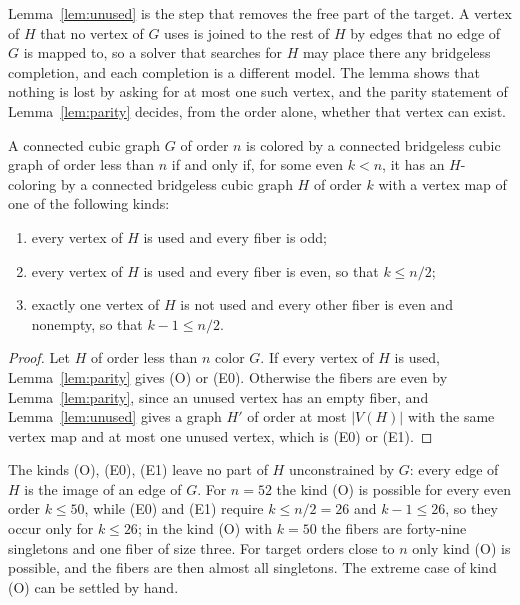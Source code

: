 Lemma~\ref{lem:unused} is the step that removes the free part of the target. A vertex of $H$ that no vertex of $G$
uses is joined to the rest of $H$ by edges that no edge of $G$ is mapped to, so a solver that searches for $H$ may place
there any bridgeless completion, and each completion is a different model. The lemma shows that nothing is lost by
asking for at most one such vertex, and the parity statement of Lemma~\ref{lem:parity} decides, from the order alone, whether
that vertex can exist.

\begin{corollary}[\evD]\label{cor:modes}
A connected cubic graph $G$ of order $n$ is colored by a connected bridgeless cubic graph of order
less than $n$ if and only if, for some even $k < n$, it has an $H$-coloring by a connected
bridgeless cubic graph $H$ of order $k$ with a vertex map of one of the following kinds:
\begin{enumerate}
\item[\textup{(O)}] every vertex of $H$ is used and every fiber is odd;
\item[\textup{(E0)}] every vertex of $H$ is used and every fiber is even, so that $k \le n/2$;
\item[\textup{(E1)}] exactly one vertex of $H$ is not used and every other fiber is even and
nonempty, so that $k - 1 \le n/2$.
\end{enumerate}
\end{corollary}

\begin{proof}
Let $H$ of order less than $n$ color $G$. If every vertex of $H$ is used, Lemma~\ref{lem:parity}
gives (O) or (E0). Otherwise the fibers are even by Lemma~\ref{lem:parity}, since an unused vertex
has an empty fiber, and Lemma~\ref{lem:unused} gives a graph $H'$ of order at most $|V(H)|$ with
the same vertex map and at most one unused vertex, which is (E0) or (E1).
\end{proof}

The kinds (O), (E0), (E1) leave no part of $H$ unconstrained by $G$: every edge of $H$ is the image
of an edge of $G$. For $n = 52$ the kind (O) is possible for every even order $k \le 50$, while (E0) and
(E1) require $k \le n/2 = 26$ and $k - 1 \le 26$, so they occur only for $k \le 26$; in the kind (O) with $k = 50$
the fibers are forty-nine singletons and one fiber of size three. For target orders close to $n$ only kind (O) is possible, and the fibers are then
almost all singletons. The extreme case of kind (O) can be settled by hand.

